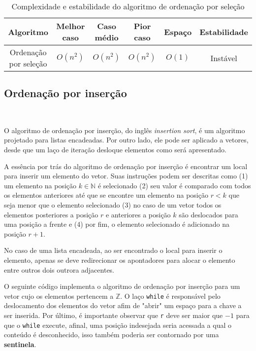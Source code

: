 \begin{table}[h]
  \centering
  \label{tab:bubble-sort}
  \begin{tabular}{|c|c|c|c|c|c|}
    \hline
    \textbf{Algoritmo} & \textbf{Melhor caso} & \textbf{Caso médio} & \textbf{Pior caso} & \textbf{Espaço}& \textbf{Estabilidade} \\ \hline
    Ordenação por seleção       & \( O(n^2) \)           & \( O(n^2) \)         & \( O(n^2) \)        & \(O(1)\) & Instável              \\ \hline
  \end{tabular}
  \caption{Complexidade e estabilidade do algoritmo de ordenação por seleção}
\end{table}


\subsection{Ordenação por inserção}
\ 

O algoritmo de ordenação por inserção, do inglês \textit{insertion sort}, é um algoritmo projetado para listas encadeadas. Por outro lado, ele pode ser aplicado a vetores, desde que um laço de iteração desloque elementos como será apresentado.

A essência por trás do algoritmo de ordenação por inserção é encontrar um local para inserir um elemento do vetor. Suas instruções podem ser descritas como (1) um elemento na posição $k \in \mathbb{N}$ é selecionado (2) seu valor é comparado com todos os elementos anteriores até que se encontre um elemento na posição $r<k$ que seja menor que o elemento selecionado (3) no caso de um vetor todos os elementos posteriores a posição $r$ e anteriores a posição $k$ são deslocados para uma posição a frente e (4) por fim, o elemento selecionado é adicionado na posição $r+1$.

No caso de uma lista encadeada, ao ser encontrado o local para inserir o elemento, apenas se deve redirecionar os apontadores para alocar o elemento entre outros dois outrora adjacentes.

O seguinte código implementa o algoritmo de ordenação por inserção para um vetor cujo os elementos pertencem a $\mathbb{Z}$. O laço \texttt{while} é responsável pelo deslocamento dos elementos do vetor afim de "abrir" um espaço para a chave a ser inserida. Por último, é importante observar que \texttt{r} deve ser maior que $-1$ para que o \texttt{while} execute, afinal, uma posição indesejada seria acessada a qual o conteúdo é desconhecido, isso também poderia ser contornado por uma \textbf{sentinela}.

